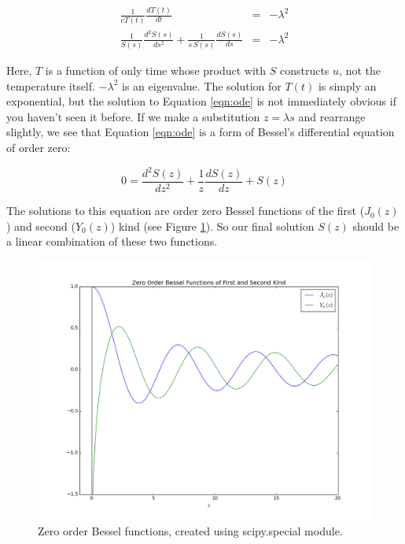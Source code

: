 \documentclass[a4paper,12pt]{article}
\begin{document}
\begin{eqnarray}
\frac{1}{c T(t)}\frac{dT(t)}{dt} &=& -\lambda^2\nonumber\\
\frac{1}{S(s)}\frac{d^2 S(s)}{ds^2} + \frac{1}{s\,S(s)}\frac{dS(s)}{ds} &=& -\lambda^2
\label{eqn:ode} 
\end{eqnarray} 

Here, $T$ is a function of only time whose product with $S$ constructs $u$, not the temperature itself. $-\lambda^2$ is an eigenvalue. The solution for $T(t)$ is simply an exponential, but the solution to Equation \ref{eqn:ode} is not immediately obvious if you haven't seen it before. If we make a substitution $z = \lambda s$ and rearrange slightly, we see that Equation \ref{eqn:ode} is a form of Bessel's differential equation of order zero:

\begin{equation}
0 = \frac{d^2S(z)}{dz^2} + \frac{1}{z}\frac{dS(z)}{dz} + S(z)\nonumber
\end{equation}

The solutions to this equation are order zero Bessel functions of the first ($J_0(z)$) and second ($Y_0(z)$) kind (see Figure \ref{fig:bes}). So our final solution $S(z)$ should be a linear combination of these two functions.

\begin{figure}[H]
\centering
\includegraphics[width = \linewidth]{bessel.png}
\caption{Zero order Bessel functions, created using scipy.special module.}
\label{fig:bes}
\end{figure}
\end{document}
